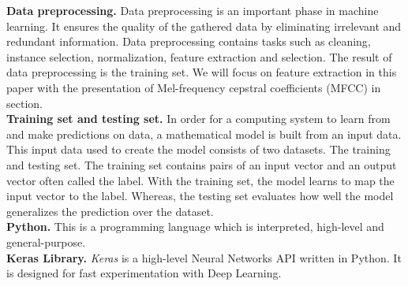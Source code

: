 \textbf{Data preprocessing.} Data preprocessing is an important phase in machine
learning. It ensures the quality of the gathered data by eliminating irrelevant
and redundant information. Data preprocessing contains tasks such as cleaning,
instance selection, normalization, feature extraction and selection. The result
of data preprocessing is the training set. We will focus on feature extraction
in this paper with the presentation of Mel-frequency cepstral coefficients
(MFCC) in section.\\


\textbf{Training set and testing set.} In order for a computing system to learn
from and make predictions on data, a mathematical model is built from an input
data. This input data used to create the model consists of two datasets. The
training and testing set. The training set contains pairs of an input vector and
an output vector often called the label. With the training set, the model learns
to map the input vector to the label. Whereas, the testing set evaluates how
well the model generalizes the prediction over the dataset.\\

\textbf{Python.} This is a programming language which is interpreted, high-level
and general-purpose.~\cite{Python}\\

\textbf{Keras Library.} \textit{Keras} is a high-level Neural Networks API
written in Python. It is designed for fast experimentation with Deep
Learning.~\cite{chollet2015keras}\\

